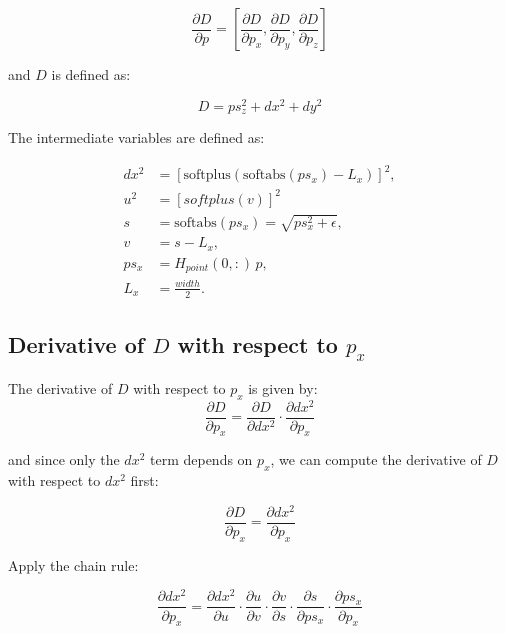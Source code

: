\documentclass[11pt]{article}
\begin{document}
        \begin{equation}
            \frac{\partial D}{\partial p} = \left[\frac{\partial D}{\partial p_{x}}, \frac{\partial D}{\partial p_{y}}, \frac{\partial D}{\partial p_{z}}\right]
        \end{equation}

        and $D$ is defined as:

        \begin{equation}
            D = ps_{z}^2 + dx^2 + dy^2
        \end{equation}

        The intermediate variables are defined as:

        \begin{align}
            dx^2 &= \left[\text{softplus}(\text{softabs}(ps_x) - L_x)\right]^2,\\
            u^2 &= [softplus(v)]^2 \\
            s &= \text{softabs}(ps_{x}) = \sqrt{ps_{x}^2 + \epsilon}, \\
            v &= s - L_x, \\
            ps_{x} &= H_{point}(0,:)\, p, \\
            L_x &= \frac{width}{2}.
        \end{align}

        \subsection*{Derivative of $D$ with respect to $p_x$}

            The derivative of \(D\) with respect to \(p_x\) is given by:
            \begin{equation}
                \frac{\partial D}{\partial p_x} = \frac{\partial D}{\partial dx^2} \cdot \frac{\partial dx^2}{\partial p_x}
            \end{equation}

            and since only the \(dx^2\) term depends on \(p_x\), we can compute the derivative of \(D\) with respect to \(dx^2\) first:

            \begin{equation}
                \frac{\partial D}{\partial p_x} = \frac{\partial dx^2}{\partial p_x}
            \end{equation}

            Apply the chain rule:
            
            \begin{equation}
                \frac{\partial dx^2}{\partial p_x}
                = \frac{\partial dx^2}{\partial u}
                \cdot \frac{\partial u}{\partial v}
                \cdot \frac{\partial v}{\partial s}
                \cdot \frac{\partial s}{\partial ps_{x}}
                \cdot \frac{\partial ps_{x}}{\partial p_x}
            \end{equation}
            
\end{document}
